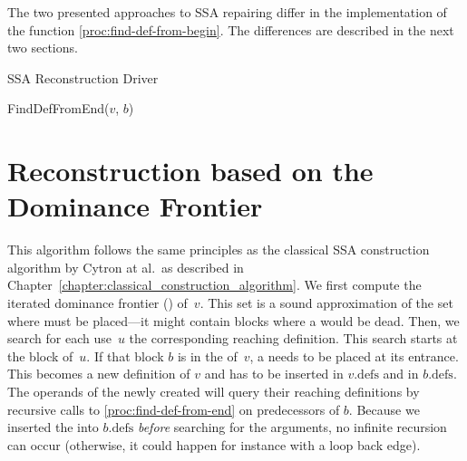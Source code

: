 {The two presented approaches to SSA repairing differ in the implementation of the function \ref{proc:find-def-from-begin}.
The differences are described in the next two sections.

\begin{algorithm}
	\caption{SSA Reconstruction Driver}
	\label{alg:ssaconstr_driver}

\end{algorithm}

\begin{procedure}
  \caption{FindDefFromEnd($v$, $b$)}
  \label{proc:find-def-from-end}
\end{procedure}

\section{Reconstruction based on the Dominance Frontier}
This algorithm follows the same principles as the classical SSA construction algorithm by Cytron at al.~as described in Chapter~\ref{chapter:classical_construction_algorithm}.
We first compute the iterated dominance frontier (\iDF) of~$v$.
This set is a sound approximation of the set where \phifuns must be placed---it might contain blocks where a \phifun would be dead.
Then, we search for each use~$u$ the corresponding reaching definition.
This search starts at the block of~$u$.
If that block $b$ is in the \iDF of~$v$, a \phifun needs to be placed at its entrance.
This \phifun becomes a new definition of $v$ and has to be inserted in $v.\textrm{defs}$ and in $b.\textrm{defs}$.
The operands of the newly created \phifun will query their reaching definitions by recursive calls to \ref{proc:find-def-from-end} on predecessors of $b$.
Because we inserted the \phifun into $b.\textrm{defs}$ \emph{before} searching for the arguments, no infinite recursion can occur (otherwise, it could happen for instance with a loop back edge).

}
